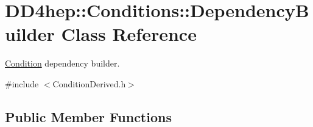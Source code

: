 \hypertarget{class_d_d4hep_1_1_conditions_1_1_dependency_builder}{}\section{D\+D4hep\+:\+:Conditions\+:\+:Dependency\+Builder Class Reference}
\label{class_d_d4hep_1_1_conditions_1_1_dependency_builder}


\hyperlink{class_d_d4hep_1_1_conditions_1_1_condition}{Condition} dependency builder.  




{\ttfamily \#include $<$Condition\+Derived.\+h$>$}

\subsection*{Public Member Functions}
